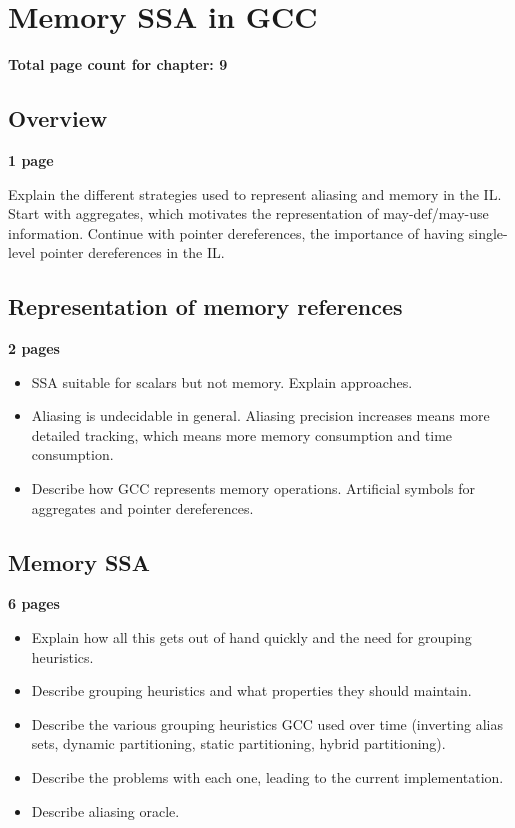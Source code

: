 \chapter{Memory SSA in GCC }

\textbf{Total page count for chapter: 9}

\section{Overview}

\textbf{1 page}

Explain the different strategies used to represent aliasing and
memory in the IL.  Start with aggregates, which motivates the
representation of may-def/may-use information.  Continue with
pointer dereferences, the importance of having single-level
pointer dereferences in the IL.

\section{Representation of memory references}

\textbf{2 pages}

\begin{itemize}
\item	SSA suitable for scalars but not memory.  Explain
	approaches.

\item	Aliasing is undecidable in general.  Aliasing precision
	increases means more detailed tracking, which means more
	memory consumption and time consumption.

\item	Describe how GCC represents memory operations.
	Artificial symbols for aggregates and pointer
	dereferences.
\end{itemize}

\section{Memory SSA}

\textbf{6 pages}

\begin{itemize}
\item	Explain how all this gets out of hand quickly and the
	need for grouping heuristics.

\item	Describe grouping heuristics and what properties they
	should maintain.

\item	Describe the various grouping heuristics GCC used over
	time (inverting alias sets, dynamic partitioning, static
	partitioning, hybrid partitioning).

\item	Describe the problems with each one, leading to the
	current implementation.

\item	Describe aliasing oracle.
\end{itemize}


